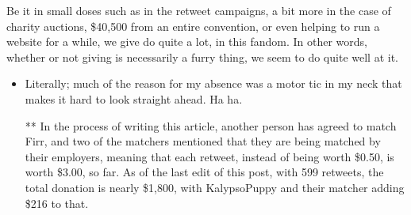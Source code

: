 Be it in small doses such as in the retweet campaigns, a bit more in the case of charity auctions, \$40,500 from an entire convention, or even helping to run a website for a while, we give do quite a lot, in this fandom. In other words, whether or not giving is necessarily a furry thing, we seem to do quite well at it.

\begin{itemize}
\tightlist
\item
  Literally; much of the reason for my absence was a motor tic in my neck that makes it hard to look straight ahead. Ha ha.

  ** In the process of writing this article, another person has agreed to match Firr, and two of the matchers mentioned that they are being matched by their employers, meaning that each retweet, instead of being worth \$0.50, is worth \$3.00, so far. As of the last edit of this post, with 599 retweets, the total donation is nearly \$1,800, with KalypsoPuppy and their matcher adding \$216 to that.
\end{itemize}
